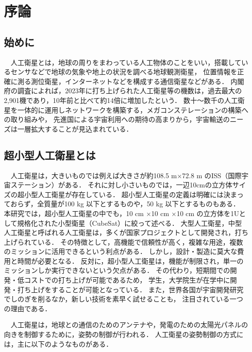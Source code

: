 \section{序論}
\subsection{始めに}
　人工衛星とは，地球の周りをまわっている人工物体のことをいい，搭載しているセンサなどで地球の気象や地上の状況を調べる地球観測衛星，
位置情報を正確に測る測位衛星，インターネットなどを構成する通信衛星などがある．
内閣府の調査によれば，2023年に打ち上げられた人工衛星等の機数は，過去最大の2,901機であり，10年前と比べて約14倍に増加したという．
数十～数千の人工衛星を一体的に運用しネットワークを構築する，メガコンステレーションの構築への取り組みや，
先進国による宇宙利用への期待の高まりから，宇宙輸送のニーズは一層拡大することが見込まれている．


\subsection{超小型人工衛星とは}
　人工衛星は，大きいものでは例えば大きさが約108.5 m×72.8 m のISS（国際宇宙ステーション）がある．
それに対し小さいものでは，一辺10cmの立方体サイズの超小型人工衛星が存在している．
超小型人工衛星の定義は明確には決まっておらず，全質量が100 kg 以下とするものや，50 kg 以下とするものもある．
本研究では，超小型人工衛星の中でも，10 cm ×10 cm ×10 cm の立方体を1Uとして規格化された小型衛星（CubeSat）に絞って述べる．
大型人工衛星，中型人工衛星と呼ばれる人工衛星は，多くが国家プロジェクトとして開発され，打ち上げられている．
その特徴として，高機能で信頼性が高く，複雑な用途，複数のミッションに活用できるという利点がある．
しかし，設計・製造に莫大な費用と時間が必要となる．
反対に，超小型人工衛星は，機能が制限され，単一のミッションしか実行できないという欠点がある．
その代わり，短期間での開発・低コストでの打ち上げが可能であるため，
学生，大学院生が在学中に開発・打ち上げをすることが可能となっている．
また，世界各国が宇宙開発研究でしのぎを削るなか，新しい技術を素早く試せることも，
注目されている一つの理由である．


　人工衛星は，地球との通信のためのアンテナや，発電のための太陽光パネルの向きを制御するために，姿勢の制御が行われる．
人工衛星の姿勢制御の方式には，主に以下のようなものがある．

